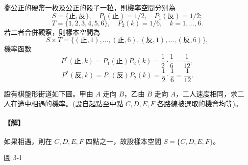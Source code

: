 \medskip
\begin{example}\label{ex:b5s-4-17}
擲公正的硬幣一枚及公正的骰子一粒，則機率空間分別為
\[
S = \{\text{正}, \text{反}\}, \quad P_1(\text{正}) = 1/2, \quad P_1(\text{反}) = 1/2;
\]
\[
T = \{1, 2, 3, 4, 5, 6\}, \quad P_2(k) = 1/6, \quad k = 1, \dots, 6.
\]
若二者合併觀察，則樣本空間為
\[
S \times T = \{(\text{正}, 1), \dots, (\text{正}, 6), (\text{反}, 1), \dots, (\text{反}, 6)\},
\]
機率函數
\[
P^*(\text{正}, k) = P_1(\text{正}) P_2(k) = \frac{1}{2} \cdot \frac{1}{6} = \frac{1}{12},
\]
\[
P^*(\text{反}, k) = P_1(\text{反}) P_2(k) = \frac{1}{2} \cdot \frac{1}{6} = \frac{1}{12}.
\]
\end{example}

\medskip
\noindent
\begin{minipage}[c]{0.56\textwidth}
\begin{example}\label{ex:b5s-4-18}
設有棋盤形街道如下圖。甲由 $A$ 走向 $B$，乙由 $B$ 走向 $A$，二人速度相同，求二人在途中相遇的機率。(設自起點至中點 $C, D, E, F$ 各路線被選取的機會均等)。
\end{example}
\paragraph{【解】}
如果相遇，則在 $C, D, E, F$ 四點之一，故設樣本空間 $S = \{C, D, E, F\}$。
\end{minipage}\hfill
\begin{minipage}[c]{0.40\textwidth}
\centering
{}
\par\vspace{0.4em}
{\small 圖 3-1\footnotemark}
\end{minipage}%
\label{note:b5s-ch4-p136-fig-num}

